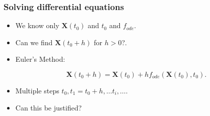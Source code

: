 \documentclass{beamer}
\begin{document}
\begin{frame}
\begin{columns}
\begin{column}{0.5\linewidth}
\frametitle{Solving differential equations}
\begin{itemize}

\item<1-> We know only $\mathbf{X}(t_0)$ and $t_0$ and $f_{ode}$.

\item<2-> Can we find $\mathbf{X}(t_0+h)$ for $h>0$?.

\item<3-> Euler's Method:

\begin{equation*}
\mathbf{X}(t_0+h) = \mathbf{X}(t_0)+h f_{ode}(\mathbf{X}(t_0),t_0).
\end{equation*}

\item<3-> Multiple steps $t_0,t_1=t_0+h,\ldots t_i,\ldots$.

\item<4-> Can this be justified?


\end{itemize}
\end{column}
\end{columns}
\end{frame}
\end{document}
